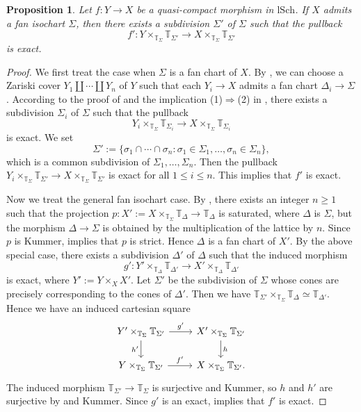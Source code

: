 \documentclass[10pt]{amsart}
\newtheorem{prop}[thm]{Proposition}
\theoremstyle{definition}
\theoremstyle{remark}
\numberwithin{equation}{subsection}
\newcommand{\T}{\mathbb{T}}
\newcommand{\lSch}{\mathrm{lSch}}
\begin{document}
\begin{prop}
\label{divlocal.12}
Let $f\colon Y\to X$ be a quasi-compact morphism in $\lSch$.
If $X$ admits a fan isochart $\Sigma$, then there exists a subdivision $\Sigma'$ of $\Sigma$ such that the pullback
\[
f'\colon Y\times_{\T_\Sigma}\T_{\Sigma'}\to X\times_{\T_\Sigma}\T_{\Sigma'}
\]
is exact.
\end{prop}
\begin{proof}
We first treat the case when $\Sigma$ is a fan chart of $X$.
By \cite[Proposition II.2.4.2]{Ogu},
we can choose a Zariski cover $Y_1\amalg \cdots \amalg Y_n$ of $Y$ such that each $Y_i\to X$ admits a fan chart $\Delta_i\to \Sigma$.
According to the proof of \cite[Theorem III.2.6.7]{Ogu} and the implication (1)$\Rightarrow$(2) in \cite[Theorem III.2.2.7]{Ogu}, there exists a subdivision $\Sigma_i$ of $\Sigma$ such that the pullback
\[
Y_i\times_{\T_{\Sigma}}\T_{\Sigma_i}
\to
X\times_{\T_{\Sigma}}\T_{\Sigma_i}
\]
is exact.
We set
\[
\Sigma'
:=
\{\sigma_1\cap \cdots \cap \sigma_n
:
\sigma_1\in \Sigma_1,\ldots,\sigma_n\in \Sigma_n\},
\]
which is a common subdivision of $\Sigma_1,\ldots,\Sigma_n$.
Then the pullback $Y_i\times_{\T_{\Sigma}}\T_{\Sigma'}\to X\times_{\T_{\Sigma}}\T_{\Sigma'}$ is exact for all $1\leq i\leq n$.
This implies that $f'$ is exact.

Now we treat the general fan isochart case.
By \cite[Theorem I.4.9.1]{Ogu},
there exists an integer $n\geq 1$ such that the projection $p\colon X':=X\times_{\T_\Sigma}\T_{\Delta}\to \T_{\Delta}$ is saturated,
where $\Delta$ is $\Sigma$, but the morphism $\Delta\to \Sigma$ is obtained by the multiplication of the lattice by $n$.
Since $p$ is Kummer,
\cite[Proposition I.4.8.12]{Ogu} implies that $p$ is strict.
Hence $\Delta$ is a fan chart of $X'$.
By the above special case,
there exists a subdivision $\Delta'$ of $\Delta$ such that the induced morphism
\[
g'\colon
Y'\times_{\T_{\Delta}}\T_{\Delta'}
\to
X'\times_{\T_{\Delta}}\T_{\Delta'}
\]
is exact,
where $Y':=Y\times_X X'$.
Let $\Sigma'$ be the subdivision of $\Sigma$ whose cones are precisely corresponding to the cones of $\Delta'$.
Then we have $\T_{\Sigma'}\times_{\T_{\Sigma}}\T_{\Delta}\simeq \T_{\Delta'}$.
Hence we have an induced cartesian square
\[
\begin{tikzcd}
Y'\times_{\T_\Sigma}\T_{\Sigma'}\ar[d,"h'"']\ar[r,"g'"]&
X'\times_{\T_\Sigma}\T_{\Sigma'}\ar[d,"h"]
\\
Y\times_{\T_\Sigma}\T_{\Sigma'}\ar[r,"f'"]&
X\times_{\T_\Sigma}\T_{\Sigma'}.
\end{tikzcd}
\]
The induced morphism $\T_{\Sigma'}\to \T_{\Sigma}$ is surjective and Kummer,
so $h$ and $h'$ are surjective by \cite[Corollary III.2.2.5]{Ogu} and Kummer.
Since $g'$ is an exact,
\cite[Proposition III.2.2.1(1)]{Ogu} implies that $f'$ is exact.
\end{proof}
\end{document}
